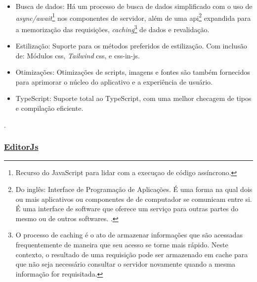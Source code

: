 \begin{itemize}
	\item Busca de dados: Há um processo de busca de dados simplificado com o uso de
                    \textit{async/await}\footnote{Recurso do JavaScript para lidar com a execuçao de código assíncrono.
                    }
                    nos componentes de servidor, além de uma
                    \acrshort{api}\footnote{Do inglês: Interface de Programação de Aplicações. É uma forma na qual
                        dois ou mais aplicativos ou componentes de de computador se comunicam
                        entre si. É uma interface de software que oferece um serviço para outras
                        partes do mesmo ou de outros softwares.
                        \cite{api-reddy}.
                    }
                    expandida para a memorização das
                    requisições,
                    \textit{caching}\footnote{O processo de caching é o ato de armazenar informações que são acessadas
                        frequentemente de maneira que seu acesso se torne mais rápido. Neste contexto,
                        o resultado de uma requisição pode ser armazenado em cache para que não
                        seja necessário consultar o servidor novamente quando a mesma informação
                        for requisitada.
                    }
                    de dados e revalidação.
                
	\item Estilização: Suporte para os métodos preferidos de estilização. Com inclusão
                    de: Módulos \acrshort{css}, \textit{Tailwind} \acrshort{css},
                    e \acrshort{css}-in-\acrshort{js}.
                
	\item Otimizações: Otimizações de scripts, imagens e fontes são também fornecidos para aprimorar
                    o núcleo do aplicativo e a experiência de usuário.
                
	\item TypeScript: Suporte total ao TypeScript, com uma melhor checagem de tipos e compilação eficiente.
                
    
\end{itemize}

\cite{nexjs-docs}.
            

\subsubsection{\underline{EditorJs}}

